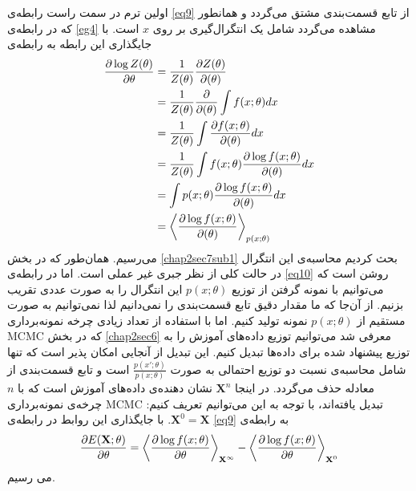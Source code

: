 اولین ترم در سمت راست رابطه‌‌ی
\ref{eq9}
از تابع قسمت‌بندی مشتق می‌گردد و همانطور که در رابطه‌ی
\ref{eg4}
مشاهده می‌‌گردد شامل یک انتگرال‌گیری بر روی
$x$
است. با جایگذاری این رابطه به رابطه‌ی
\begin{align}
	\centering
	\label{eq10}
	\dfrac{\partial\log Z(\theta)}{\partial \theta} &= \dfrac{1}{Z(\theta)}\dfrac{\partial Z(\theta)}{\partial(\theta)}\\ \nonumber
	&=\dfrac{1}{Z(\theta)}\dfrac{\partial}{\partial(\theta)}\int f(x;\theta)dx\\ \nonumber
	&=\dfrac{1}{Z(\theta)}\int \dfrac{\partial f(x;\theta)}{\partial(\theta)}dx\\	\nonumber
	&=\dfrac{1}{Z(\theta)}\int f(x;\theta) \dfrac{\partial \log f(x;\theta)}{\partial(\theta)}dx\\ \nonumber
	&= \int p(x;\theta) \dfrac{\partial \log f(x;\theta)}{\partial(\theta)}dx\\ \nonumber
	&= \left\langle \dfrac{\partial \log f(x;\theta)}{\partial(\theta)}\right\rangle_{p(x;\theta)}
\end{align}
می‌رسیم. همان‌طور که در بخش
\ref{chap2sec7sub1}
بحث کردیم محاسبه‌ی این انتگرال در حالت کلی‌ از نظر جبری غیر عملی‌ است. اما در رابطه‌ی
\ref{eq10}
روشن است که می‌‌توانیم با نمونه گرفتن از توزیع
$p(x;\theta)$
این انتگرال را به صورت عددی تقریب بزنیم.
از آن‌جا که ما مقدار دقیق تابع قسمت‌بندی را نمی‌‌دانیم لذا نمی‌‌توانیم به صورت مستقیم از
$p(x;\theta)$
نمونه تولید کنیم. اما با استفاده از تعداد زیادی چرخه نمونه‌برداری
MCMC
که در بخش
\ref{chap2sec6}
معرفی‌ شد می‌توانیم توزیع داده‌های آموزش  را به توزیع پیشنهاد شده برای داده‌ها تبدیل کنیم. این تبدیل از آنجایی امکان پذیر است که تنها شامل محاسبه‌ی نسبت دو توزیع احتمالی‌ به صورت
$\frac{p(x';\theta)}{p(x;\theta)}$
است و تابع قسمت‌بندی از معادله حذف می‌‌گردد. در اینجا
$\textbf{X}^n$
نشان دهنده‌ی داده‌های آموزش است که با
$n$ 
چرخه‌ی نمونه‌برداری
MCMC
تبدیل یافته‌اند، با توجه به این می‌‌توانیم تعریف کنیم‌:
$\textbf{X}^0 = \textbf{X}$.
با جایگذاری این روابط در رابطه‌ی
\ref{eq9}
به رابطه‌ی
\begin{align}
	\centering
	\label{eq11}
	\dfrac{\partial E(\textbf{X};\theta)}{\partial \theta} = \left\langle \dfrac{\partial \log f(x; \theta)}{\partial \theta} \right\rangle_{\textbf{X}^{\infty}} - \left\langle \dfrac{\partial \log f(x;\theta)}{\partial \theta}\right\rangle_{\textbf{X}^0}
\end{align}
می‌ رسیم.

